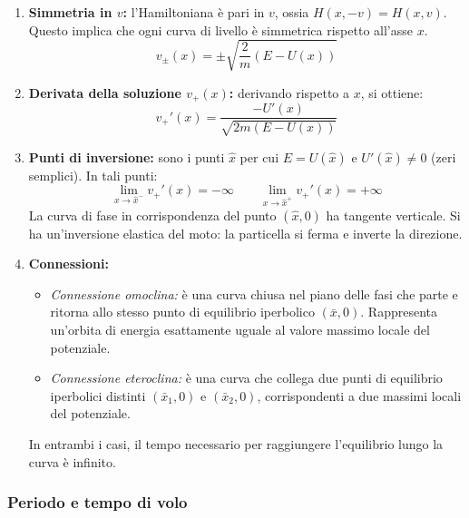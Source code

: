 \begin{enumerate}
    \item \textbf{Simmetria in $v$:} l'Hamiltoniana è pari in $v$, ossia $H(x,-v)=H(x,v)$. Questo implica che ogni curva di livello è simmetrica rispetto all'asse $x$.
    \begin{equation}
        v_\pm(x) = \pm \sqrt{ \frac{2}{m}(E - U(x)) }
    \end{equation}

    \item \textbf{Derivata della soluzione $v_+(x)$:} derivando rispetto a $x$, si ottiene:
    \begin{equation}
        v_+'(x) = \frac{-U'(x)}{ \sqrt{2m(E - U(x))} }
    \end{equation}
    
    \item \textbf{Punti di inversione:} sono i punti $\hat{x}$ per cui $E = U(\hat{x})$ e $U'(\hat{x}) \neq 0$ (zeri semplici). In tali punti:
    \begin{equation}
        \lim_{x \to \hat{x}^-} v_+'(x) = -\infty \qquad \lim_{x \to \hat{x}^+} v_+'(x) = +\infty
    \end{equation}
    La curva di fase in corrispondenza del punto $(\hat{x}, 0)$ ha tangente verticale. Si ha un'inversione elastica del moto: la particella si ferma e inverte la direzione.
    \item \textbf{Connessioni:} 
    \begin{itemize}
        \item \textit{Connessione omoclina:} è una curva chiusa nel piano delle fasi che parte e ritorna allo stesso punto di equilibrio iperbolico $(\bar{x}, 0)$.
         Rappresenta un'orbita di energia esattamente uguale al valore massimo locale del potenziale.
        \item \textit{Connessione eteroclina:} è una curva che collega due punti di equilibrio iperbolici distinti $(\bar{x}_1,0)$ e $(\bar{x}_2,0)$,
         corrispondenti a due massimi locali del potenziale.
    \end{itemize}
    In entrambi i casi, il tempo necessario per raggiungere l'equilibrio lungo la curva è infinito.

\end{enumerate}



\subsubsection{Periodo e tempo di volo}

